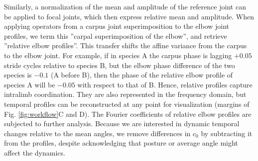 \documentclass[10pt, a4paper]{article}
\begin{document}
\begin{linenumbers}[1]
Similarly, a normalization of the mean and amplitude of the reference joint can be applied to focal joints, which then express relative mean and amplitude. 
When applying operators from a carpus joint superimposition to the elbow joint profiles, we term this ''carpal superimposition of the elbow'', and retrieve ''relative elbow profiles''. 
This transfer shifts the affine variance from the carpus to the elbow joint. 
For example, if in species A the carpus phase is lagging $+0.05$ stride cycles relative to species B, but the elbow phase difference of the two species is $-0.1$ (A before B), then the phase of the relative elbow profile of species A will be $-0.05$ with respect to that of B. 
Hence, relative profiles capture intralimb coordination. 
They are also represented in the frequency domain, but temporal profiles can be reconstructed at any point for visualization  (margins of Fig. \ref{fig:workflow}C and D). 
The Fourier coefficients of relative elbow profiles are subjected to further analysis. 
Because we are interested in dynamic temporal changes relative to the mean angles, we remove differences in $c_0$ by subtracting it from the profiles, despite acknowledging that posture or average angle might affect the dynamics. 


\end{linenumbers}
\end{document}
